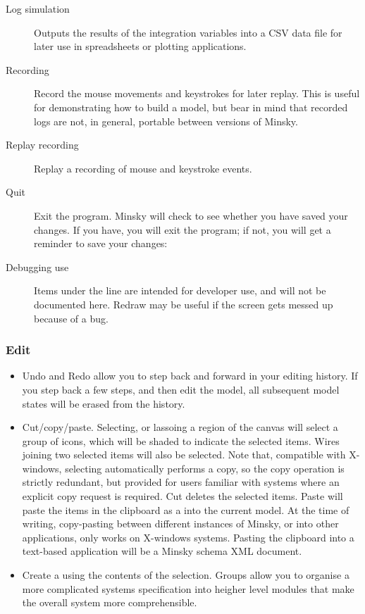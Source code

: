 \begin{description}
\item[Log simulation] Outputs the results of the integration variables
into a CSV data file for later use in spreadsheets or plotting
applications.

\item[Recording] Record the mouse movements and keystrokes for later
replay. This is useful for demonstrating how to build a model, but
bear in mind that recorded logs are not, in general, portable between
versions of Minsky.

\item[Replay recording] Replay a recording of mouse and keystroke events.

\item[Quit] Exit the program. Minsky will check to see whether you have saved your changes. If you have, you will exit the program; if not, you will get a reminder to save your changes:

\item[Debugging use] Items under the line are intended for developer
  use, and will not be documented here. Redraw may be useful if the
  screen gets messed up because of a bug.

\end{description}

\subsubsection{Edit}
\label{Edit}

\begin{itemize}
\item\label{edit:undo} Undo and Redo allow you to step back and forward in your editing
history. If you step back a few steps, and then edit the model, all
subsequent model states will be erased from the history.

\item\label{edit:copy} Cut/copy/paste. Selecting, or lassoing a region
of the canvas will select a group of icons, which will be shaded to
indicate the selected items. Wires joining two selected items will
also be selected. Note that, compatible with X-windows, selecting
automatically performs a copy, so the copy operation is strictly
redundant, but provided for users familiar with systems where an
explicit copy request is required. Cut deletes the selected
items. Paste will paste the items in the clipboard as a
 into the current model. At the time of writing,
copy-pasting between different instances of Minsky, or into other
applications, only works on X-windows systems. Pasting the clipboard
into a text-based application will be a Minsky schema XML document.

\item\label{edit:group} Create a  using the
contents of the selection. Groups allow you to organise a more
complicated systems specification into heigher level modules that make
the overall system more comprehensible.

\end{itemize}

